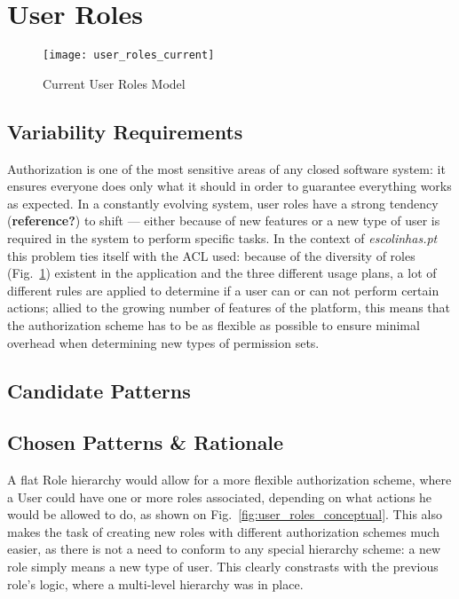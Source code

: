 \section{User Roles}\label{sec:fa_roles}

\begin{figure}[H]
  \centering
  \texttt{[image: user\_roles\_current]}
  \caption{Current User Roles Model}
  \label{fig:user_roles_current}
\end{figure}

\subsection{Variability Requirements}\label{sec:fa_roles_variability_requirements}

Authorization is one of the most sensitive areas of any closed software system: it ensures everyone does only what it should in order to guarantee everything works as expected. In a constantly evolving system, user roles have a strong tendency (\textbf{reference?}) to shift --- either because of new features or a new type of user is required in the system to perform specific tasks. In the context of \emph{escolinhas.pt} this problem ties itself with the ACL used: because of the diversity of roles (Fig.~\ref{fig:user_roles_current}) existent in the application and the three different usage plans, a lot of different rules are applied to determine if a user can or can not perform certain actions; allied to the growing number of features of the platform, this means that the authorization scheme has to be as flexible as possible to ensure minimal overhead when determining new types of permission sets.

\subsection{Candidate Patterns}\label{sec:fa_roles_candidate_patterns}

\subsection{Chosen Patterns \& Rationale}\label{sec:fa_roles_chosen_patterns_rationale}

A flat Role hierarchy would allow for a more flexible authorization scheme, where a User could have one or more roles associated, depending on what actions he would be allowed to do, as shown on Fig.~\ref{fig:user_roles_conceptual}. This also makes the task of creating new roles with different authorization schemes much easier, as there is not a need to conform to any special hierarchy scheme: a new role simply means a new type of user. This clearly constrasts with the previous role's logic, where a multi-level hierarchy was in place.


